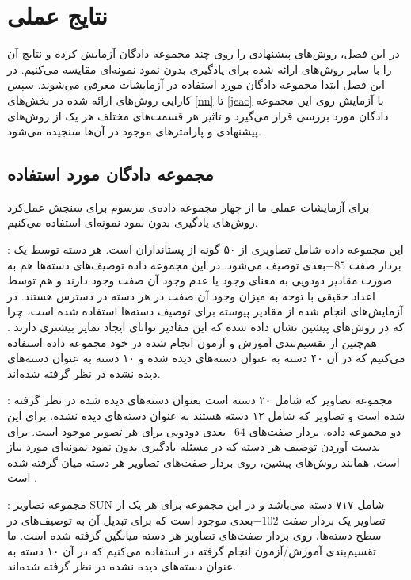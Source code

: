 \chapter{نتایج عملی} \label{chap:experiments}
در این فصل، روش‌های پیشنهادی را روی چند مجموعه دادگان آزمایش کرده و نتایج آن را با سایر روش‌های ارائه شده برای یادگیری بدون نمود نمونه‌ای مقایسه می‌کنیم. در این فصل ابتدا مجموعه دادگان مورد استفاده در آزمایشات معرفی می‌شوند. سپس کارایی روش‌های ارائه شده در بخش‌های
\ref{nn}
تا
\ref{jeac}
با آزمایش روی این مجموعه دادگان مورد بررسی قرار می‌گیرد و تاثیر هر قسمت‌های مختلف هر یک از روش‌های پیشنهادی و پارامترهای موجود در آن‌ها سنجیده می‌شود.


\section{مجموعه دادگان مورد استفاده}\label{exp:datasets}
برای آزمایشات عملی ما از چهار مجموعه داده‌ی مرسوم برای سنجش عمل‌کرد روش‌های یادگیری بدون نمود نمونه‌ای استفاده می‌کنیم.

\textbf{} \cite{lampert09}:
این مجموعه داده شامل تصاویری از ۵۰ گونه از پستانداران است. هر دسته توسط یک بردار صفت $-85$بعدی توصیف می‌شود. در این مجموعه داده توصیف‌های دسته‌ها هم به صورت مقادیر دودویی به معنای وجود یا عدم وجود آن صفت وجود دارند و هم توسط اعداد حقیقی با توجه به میزان وجود آن صفت در هر دسته در دسترس هستند. در آزمایش‌های انجام شده از مقادیر پیوسته برای توصیف دسته‌ها استفاده شده است، چرا که در روش‌های پیشین نشان داده شده که این مقادیر توانای ایجاد تمایز بیشتری دارند \cite{Akata2015}. هم‌چنین از تقسیم‌بندی آموزش و آزمون انجام شده در خود مجموعه داده استفاده می‌کنیم که در آن ۴۰ دسته به عنوان دسته‌های دیده شده و ۱۰ دسته به عنوان
دسته‌های دیده نشده در نظر گرفته شده‌اند.

\textbf{}\cite{farhadi09}:
مجموعه تصاویر
  \cite{pascal}
 که شامل ۲۰ دسته است بعنوان دسته‌های دیده شده در نظر گرفته شده است و تصاویر  که شامل ۱۲ دسته هستند به عنوان دسته‌های دیده نشده. برای این دو مجموعه داده، بردار صفت‌های $-64$بعدی دودویی برای هر تصویر موجود است. برای بدست آوردن توصیف هر دسته که در مسئله یادگیری بدون نمود نمونه‌ای مورد نیاز است، همانند روش‌های پیشین، روی بردار صفت‌های تصاویر هر دسته میان گرفته
 شده است  \cite{lampert09}.


\textbf{} \cite{sun}:
مجموعه تصاویر SUN شامل ۷۱۷ دسته می‌باشد و در این مجموعه برای هر یک از تصاویر یک بردار صفت $-102$بعدی موجود است که برای تبدیل آن به توصیف‌های در سطح دسته‌ها، روی بردار صفت‌های تصاویر هر دسته میانگین گرفته شده است. ما تقسیم‌بندی آموزش/آزمون انجام گرفته در \cite{jayaraman14} استفاده می‌کنیم که در آن ۱۰ دسته به عنوان دسته‌های دیده نشده در نظر گرفته شده‌اند.

